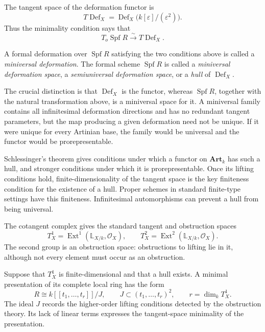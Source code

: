 The tangent space of the deformation functor
is
$$
T\operatorname{Def}_X=
\operatorname{Def}_X
\big(k[\varepsilon]/(\varepsilon^2)\big).
$$
Thus the minimality condition says that
$$
T_o\operatorname{Spf}R
\xrightarrow{\sim}
T\operatorname{Def}_X.
$$

\begin{definition}
\label{definition-miniversal-deformation}
A formal deformation over
$\operatorname{Spf}R$ satisfying the two
conditions above is called a
\emph{miniversal deformation}. The formal
scheme $\operatorname{Spf}R$ is called a
\emph{miniversal deformation space}, a
\emph{semiuniversal deformation space}, or
a \emph{hull} of $\operatorname{Def}_X$.
\end{definition}

\noindent
The crucial distinction is that
$\operatorname{Def}_X$ is the functor,
whereas $\operatorname{Spf}R$, together
with the natural transformation above, is
a miniversal space for it.
A miniversal family contains all
infinitesimal deformation directions and has
no redundant tangent parameters, but the map
producing a given deformation need not be
unique. If it were unique for every Artinian
base, the family would be universal and the
functor would be prorepresentable.

Schlessinger's theorem gives conditions under
which a functor on $\mathbf{Art}_k$ has such
a hull, and stronger conditions under which
it is prorepresentable. Once its lifting
conditions hold, finite-dimensionality of
the tangent space is the key finiteness
condition for the existence of a hull.
Proper schemes in standard finite-type
settings have this finiteness. Infinitesimal
automorphisms can prevent a hull from being
universal.

The cotangent complex gives the standard
tangent and obstruction spaces
$$
T^1_X=\operatorname{Ext}^1
(\mathbb{L}_{X/k},\mathcal{O}_X),
\qquad
T^2_X=\operatorname{Ext}^2
(\mathbb{L}_{X/k},\mathcal{O}_X).
$$
The second group is an obstruction space:
obstructions to lifting lie in it, although
not every element must occur as an
obstruction.

Suppose that $T^1_X$ is finite-dimensional
and that a hull exists. A minimal
presentation of its complete local ring has
the form
$$
R\cong k[[t_1,\ldots,t_r]]/J,
\qquad
J\subset (t_1,\ldots,t_r)^2,
\qquad
r=\dim_kT^1_X.
$$
The ideal $J$ records the higher-order
lifting conditions detected by the
obstruction theory. Its lack of linear terms
expresses the tangent-space minimality of the
presentation.

